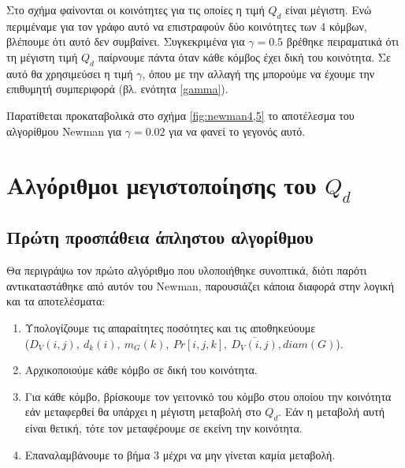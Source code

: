 \documentclass[12pt, letterpaper]{article}
\newcommand{\en}{\selectlanguage{english}}
\newcommand{\gr}{\selectlanguage{greek}}
\begin{document}
Στο σχήμα φαίνονται οι κοινότητες για τις οποίες η τιμή $Q_d$ είναι μέγιστη. Ενώ περιμέναμε για τον γράφο αυτό να επιστραφούν 
δύο κοινότητες των 4 κόμβων, βλέπουμε ότι αυτό δεν συμβαίνει. Συγκεκριμένα για $\gamma = 0.5$ βρέθηκε πειραματικά ότι 
τη μέγιστη τιμή $Q_d$ παίρνουμε πάντα όταν κάθε κόμβος έχει δική του κοινότητα. Σε αυτό θα χρησιμεύσει η τιμή $\gamma$, όπου με την 
αλλαγή της μπορούμε να έχουμε την επιθυμητή συμπεριφορά (βλ. ενότητα \ref{gamma}).

Παρατίθεται προκαταβολικά στο σχήμα \ref{fig:newman4,5} το αποτέλεσμα του αλγορίθμου \textlatin{Newman} για $\gamma = 0.02$ για να φανεί 
το γεγονός αυτό.















\section{Αλγόριθμοι μεγιστοποίησης του $Q_d$}



\subsection{Πρώτη προσπάθεια άπληστου αλγορίθμου}

Θα περιγράψω τον πρώτο αλγόριθμο που υλοποιήθηκε συνοπτικά, διότι παρότι αντικαταστάθηκε 
από αυτόν του \en Newman, \gr παρουσιάζει κάποια διαφορά στην λογική και τα αποτελέσματα:

\begin{enumerate}
  \item Υπολογίζουμε τις απαραίτητες ποσότητες και τις αποθηκεύουμε \\ ($D_V(i,j), \ d_k(i), \ m_G(k), \ Pr[i,j,k],  \ \overline{D_V(i,j)},diam(G)$).
  \item Αρχικοποιούμε κάθε κόμβο σε δική του κοινότητα.
  \item Για κάθε κόμβο, βρίσκουμε τον γειτονικό του κόμβο στου οποίου την κοινότητα 
  εάν μεταφερθεί θα υπάρχει η μέγιστη μεταβολή στο $Q_d$. Εάν η μεταβολή αυτή είναι θετική,
  τότε τον μεταφέρουμε σε εκείνη την κοινότητα.
  \item Επαναλαμβάνουμε το βήμα 3 μέχρι να μην γίνεται καμία μεταβολή.
\end{enumerate}
\end{document}
